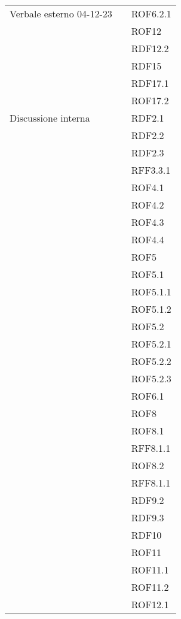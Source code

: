 \begin{xltabular}{\textwidth}{ p{0.3\textwidth} | X | p{0.2\textwidth} }
    Verbale esterno 04-12-23 & & ROF6.2.1\\
    &&ROF12\\
    &&RDF12.2\\
    &&RDF15\\
    &&RDF17.1\\
    &&ROF17.2\\


    Discussione interna & & RDF2.1\\ 
    &&RDF2.2\\ 
    &&RDF2.3\\ 
    &&RFF3.3.1\\ 
    &&ROF4.1\\ 
    &&ROF4.2\\ 
    &&ROF4.3\\ 
    &&ROF4.4\\ 
    &&ROF5\\ 
    &&ROF5.1\\ 
    &&ROF5.1.1\\ 
    &&ROF5.1.2\\ 
    &&ROF5.2\\ 
    &&ROF5.2.1\\ 
    &&ROF5.2.2\\ 
    &&ROF5.2.3\\ 
    &&ROF6.1\\ 
    &&ROF8\\ 
    &&ROF8.1\\ 
    &&RFF8.1.1\\ 
    &&ROF8.2\\ 
    &&RFF8.1.1\\ 
    &&RDF9.2\\ 
    &&RDF9.3\\ 
    &&RDF10\\ 
    &&ROF11\\ 
    &&ROF11.1\\ 
    &&ROF11.2\\ 
    &&ROF12.1\\ 

\end{xltabular}
